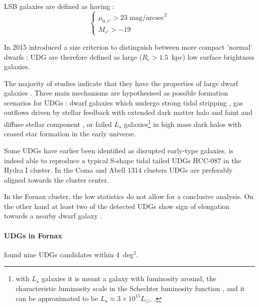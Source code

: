 LSB galaxies are defined as having \citep{Venhola2017}:
\begin{equation}
\begin{cases}
 \mu_{0,r'} > 23 \mbox{ mag/arcsec}^2\\
 M_{r'} > -19
\end{cases}
\end{equation}

In 2015 \citet{VanDokkum2015} introduced a size criterion to distinguish between more compact 'normal' dwarfs \citep{Sales2021}:
UDG are therefore defined as large ($R_e > 1.5$~kpc) low surface brightness galaxies.

The majority of studies indicate that they have the properties of large dwarf galaxies \citep{Sandage1984, Roman2017, Venhola2017, Saifollahi2021}.
Three main mechanisms are hypothesised as possible formation scenarios for UDGs \citep{Rong2020}:
dwarf galaxies which undergo strong tidal stripping \citep{Venhola2017, Carleton2018, Rong2020a},
gas outflows driven by stellar feedback with extended dark matter halo and faint and diffuse stellar component \citep{DiCintio2017, ManceraPina2019},
or failed $L_\star$ galaxies\footnote{with $L_\star$ galaxies it is meant a galaxy with luminosity around, the characteristic luminosity scale in the Schechter luminosity function \citep{Press1974}, and it can be approximated to be $L_\star \approx 3\times10^{11}L_\odot$, \cf{}  \citet{Cooray2005}.} in high mass dark halos with ceased star formation in the early universe.

Some UDGs have earlier been identified as disrupted early-type galaxies.
\citet{Koch2012} is indeed able to reproduce a typical S-shape tidal tailed UDGs HCC-087 in the Hydra I cluster. 
In the Coma and Abell 1314 clusters \citep{Yagi2016, ManceraPina2019} UDGs are preferably aligned towards the cluster center.

In the Fornax cluster, the low statistics do not allow for a conclusive analysis.
On the other hand at least two of the detected UDGs show sign of elongation towards a nearby dwarf galaxy \citep[with $M_{r'} > -19$~mag, see][]{Venhola2017}.

\paragraph{UDGs in Fornax}
\citet{Venhola2017} found nine UDGs candidates within 4~deg$^2$. 
 
